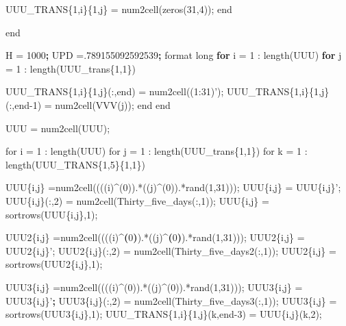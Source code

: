 \documentclass[]{DissertateUSU}
\newenvironment{Shaded}{\begin{snugshade}}{\end{snugshade}}
\newcommand{\KeywordTok}[1]{\textcolor[rgb]{0.13,0.29,0.53}{\textbf{#1}}}
\newcommand{\DataTypeTok}[1]{\textcolor[rgb]{0.13,0.29,0.53}{#1}}
\newcommand{\StringTok}[1]{\textcolor[rgb]{0.31,0.60,0.02}{#1}}
\newcommand{\ExtensionTok}[1]{#1}
\newcommand{\NormalTok}[1]{#1}
\begin{document}
\begin{Shaded}
\begin{Highlighting}[]
{{{{{{{{{{        \ExtensionTok{UUU_TRANS}\DataTypeTok{\{1,i\}\{1,j\}}\NormalTok{ = num2cell(zeros(31,4));}
    \ExtensionTok{end}
    
\ExtensionTok{end}

\ExtensionTok{%
\ExtensionTok{H}\NormalTok{ = 1000}\KeywordTok{;}
\ExtensionTok{UPD}\NormalTok{ =.789155092592539}\KeywordTok{;}
\ExtensionTok{format}\NormalTok{ long}
\ExtensionTok{%
\KeywordTok{for} \ExtensionTok{i}\NormalTok{ = 1 : length(UUU)}
    \KeywordTok{for} \ExtensionTok{j}\NormalTok{ = 1 : length(UUU_trans}\DataTypeTok{\{1,1\}}\NormalTok{)}
        
        \ExtensionTok{UUU_TRANS}\DataTypeTok{\{1,i\}\{1,j\}}\NormalTok{(:,end) = }\ExtensionTok{num2cell}\NormalTok{((1:31)}\StringTok{');}
\StringTok{        UUU_TRANS\{1,i\}\{1,j\}(:,end-1) = num2cell(VVV(j));}
\StringTok{        }
\StringTok{        }
\StringTok{        }
\StringTok{    end}
\StringTok{    }
\StringTok{end}

\StringTok{UUU = num2cell(UUU);}
\StringTok{%


\StringTok{for i = 1 : length(UUU)}
\StringTok{    for j = 1 : length(UUU_trans\{1,1\})}
\StringTok{        for k = 1 : length(UUU_TRANS\{1,5\}\{1,1\})}
\StringTok{            %
\StringTok{            UUU\{i,j\} =num2cell((((i)^(0)).*((j)^(0)).*rand(1,31)));}
\StringTok{            UUU\{i,j\} = UUU\{i,j\}'}\NormalTok{;}
            \ExtensionTok{UUU}\DataTypeTok{\{i,j\}}\NormalTok{(:,2) = }\ExtensionTok{num2cell}\NormalTok{(Thirty_five_days(:,1));}
            \ExtensionTok{UUU}\DataTypeTok{\{i,j\}}\NormalTok{ = sortrows(UUU}\DataTypeTok{\{i,j\}}\NormalTok{,1);}
            
            \ExtensionTok{%
            \ExtensionTok{UUU2}\DataTypeTok{\{i,j\}}\NormalTok{ =num2cell((((i)^}\KeywordTok{(}\ExtensionTok{0}\KeywordTok{)}\NormalTok{)}\ExtensionTok{.*}\NormalTok{((j)^}\KeywordTok{(}\ExtensionTok{0}\KeywordTok{)}\NormalTok{)}\ExtensionTok{.*rand}\NormalTok{(1,31)));}
            \ExtensionTok{UUU2}\DataTypeTok{\{i,j\}}\NormalTok{ = UUU2}\DataTypeTok{\{i,j\}}\StringTok{';}
\StringTok{            UUU2\{i,j\}(:,2) = num2cell(Thirty_five_days2(:,1));}
\StringTok{            UUU2\{i,j\} = sortrows(UUU2\{i,j\},1);}
\StringTok{            %
\StringTok{            UUU3\{i,j\} =num2cell((((i)^(0)).*((j)^(0)).*rand(1,31)));}
\StringTok{            UUU3\{i,j\} = UUU3\{i,j\}'}\KeywordTok{;}
            \ExtensionTok{UUU3}\DataTypeTok{\{i,j\}}\NormalTok{(:,2) = }\ExtensionTok{num2cell}\NormalTok{(Thirty_five_days3(:,1));}
            \ExtensionTok{UUU3}\DataTypeTok{\{i,j\}}\NormalTok{ = sortrows(UUU3}\DataTypeTok{\{i,j\}}\NormalTok{,1);}
            \ExtensionTok{%
            \ExtensionTok{UUU_TRANS}\DataTypeTok{\{1,i\}\{1,j\}}\NormalTok{(k,end-3) = }\ExtensionTok{UUU}\DataTypeTok{\{i,j\}}\NormalTok{(k,2);}
            
}}}}}}}}}}}}}}}}}
\end{Highlighting}
\end{Shaded}
\end{document}
